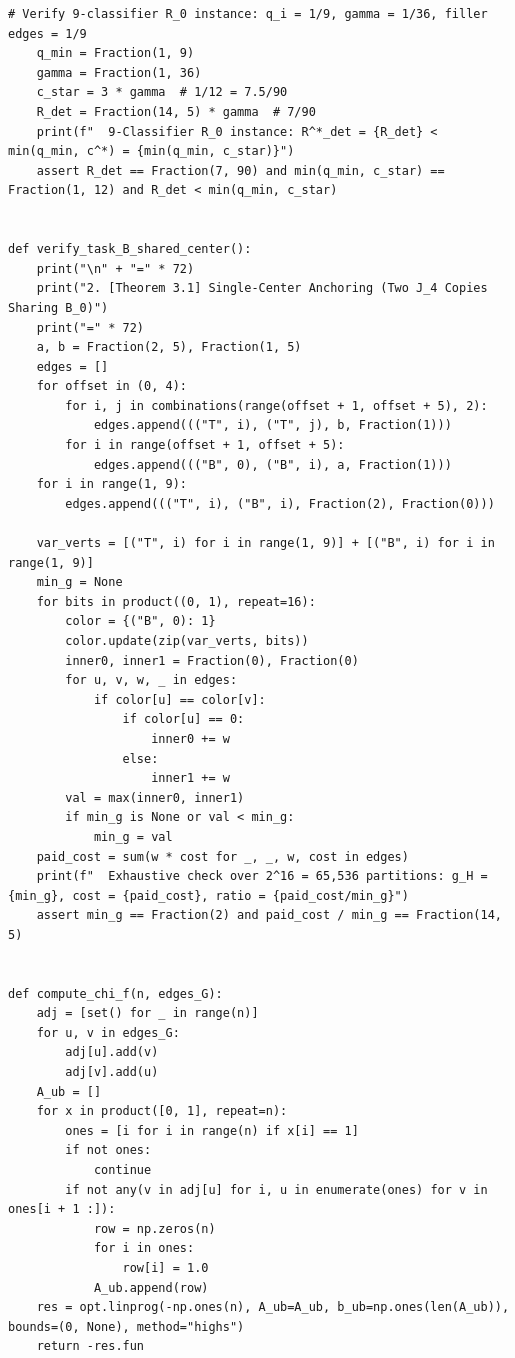 \documentclass[11pt,a4paper]{ctexart}
\theoremstyle{definition}
\newcommand{\1}{\boldsymbol 1}
\newcommand{\0}{\boldsymbol 0}
\begin{document}
\begin{lstlisting}[style=pycode,caption={一般 $B_{\rm graph}$ 核心定理与 9 分类器 $R_0$ 反例精确复核脚本（\texttt{Bgraph\_breakthrough\_verify.py}）}]
    # Verify 9-classifier R_0 instance: q_i = 1/9, gamma = 1/36, filler edges = 1/9
    q_min = Fraction(1, 9)
    gamma = Fraction(1, 36)
    c_star = 3 * gamma  # 1/12 = 7.5/90
    R_det = Fraction(14, 5) * gamma  # 7/90
    print(f"  9-Classifier R_0 instance: R^*_det = {R_det} < min(q_min, c^*) = {min(q_min, c_star)}")
    assert R_det == Fraction(7, 90) and min(q_min, c_star) == Fraction(1, 12) and R_det < min(q_min, c_star)


def verify_task_B_shared_center():
    print("\n" + "=" * 72)
    print("2. [Theorem 3.1] Single-Center Anchoring (Two J_4 Copies Sharing B_0)")
    print("=" * 72)
    a, b = Fraction(2, 5), Fraction(1, 5)
    edges = []
    for offset in (0, 4):
        for i, j in combinations(range(offset + 1, offset + 5), 2):
            edges.append((("T", i), ("T", j), b, Fraction(1)))
        for i in range(offset + 1, offset + 5):
            edges.append((("B", 0), ("B", i), a, Fraction(1)))
    for i in range(1, 9):
        edges.append((("T", i), ("B", i), Fraction(2), Fraction(0)))

    var_verts = [("T", i) for i in range(1, 9)] + [("B", i) for i in range(1, 9)]
    min_g = None
    for bits in product((0, 1), repeat=16):
        color = {("B", 0): 1}
        color.update(zip(var_verts, bits))
        inner0, inner1 = Fraction(0), Fraction(0)
        for u, v, w, _ in edges:
            if color[u] == color[v]:
                if color[u] == 0:
                    inner0 += w
                else:
                    inner1 += w
        val = max(inner0, inner1)
        if min_g is None or val < min_g:
            min_g = val
    paid_cost = sum(w * cost for _, _, w, cost in edges)
    print(f"  Exhaustive check over 2^16 = 65,536 partitions: g_H = {min_g}, cost = {paid_cost}, ratio = {paid_cost/min_g}")
    assert min_g == Fraction(2) and paid_cost / min_g == Fraction(14, 5)


def compute_chi_f(n, edges_G):
    adj = [set() for _ in range(n)]
    for u, v in edges_G:
        adj[u].add(v)
        adj[v].add(u)
    A_ub = []
    for x in product([0, 1], repeat=n):
        ones = [i for i in range(n) if x[i] == 1]
        if not ones:
            continue
        if not any(v in adj[u] for i, u in enumerate(ones) for v in ones[i + 1 :]):
            row = np.zeros(n)
            for i in ones:
                row[i] = 1.0
            A_ub.append(row)
    res = opt.linprog(-np.ones(n), A_ub=A_ub, b_ub=np.ones(len(A_ub)), bounds=(0, None), method="highs")
    return -res.fun



\end{lstlisting}
\end{document}
